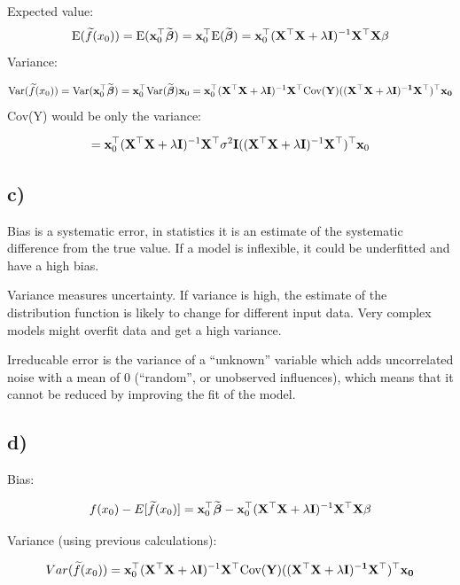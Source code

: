 \documentclass[
]{article}
\begin{document}
Expected value:
\[ \text{E}(\widetilde{f}({x_0})) = \text{E}(\mathbf{x}^\top_0 \widetilde{\boldsymbol \beta}) = \mathbf{x}^\top_0 \text{E}(\widetilde{\boldsymbol \beta}) = \mathbf{x}^\top_0 (\mathbf{X}^\top\mathbf{X}+\lambda {\bf I})^{-1}\mathbf{X}^\top\mathbf{X}\beta \]
Variance:

\[ \text{Var}(\widetilde{f}({x_0})) = \text{Var}(\mathbf{x}^\top_0 \widetilde{\boldsymbol \beta}) = \mathbf{x}^\top_0 \text{Var}(\widetilde{\boldsymbol \beta}) \mathbf{x}_0 = \mathbf{x}^\top_0 (\mathbf{X}^\top\mathbf{X}+\lambda {\bf I})^{-1}\mathbf{X}^\top \text{Cov}(\bf{Y}) ((\mathbf{X}^\top\mathbf{X}+\lambda {\bf I})^{-1}\mathbf{X}^\top)^\top \mathbf{x}_0 \]
Cov(Y) would be only the variance:

\[ = \mathbf{x}^\top_0 (\mathbf{X}^\top\mathbf{X}+\lambda {\bf I})^{-1}\mathbf{X}^\top \sigma^{2} \mathbf{I} ((\mathbf{X}^\top\mathbf{X}+\lambda {\bf I})^{-1}\mathbf{X}^\top)^\top \mathbf{x}_0 \]

\hypertarget{c}{%
\subsection{c)}\label{c}}

Bias is a systematic error, in statistics it is an estimate of the
systematic difference from the true value. If a model is inflexible, it
could be underfitted and have a high bias.

Variance measures uncertainty. If variance is high, the estimate of the
distribution function is likely to change for different input data. Very
complex models might overfit data and get a high variance.

Irreducable error is the variance of a ``unknown'' variable which adds
uncorrelated noise with a mean of 0 (``random'', or unobserved
influences), which means that it cannot be reduced by improving the fit
of the model.

\hypertarget{d}{%
\subsection{d)}\label{d}}

Bias:

\[ f({x_0}) - E[\widetilde{f}({x_0})] = \mathbf{x}^\top_0 \widetilde{\boldsymbol \beta} - \mathbf{x}^\top_0 (\mathbf{X}^\top\mathbf{X}+\lambda {\bf I})^{-1}\mathbf{X}^\top\mathbf{X}\beta  \]

Variance (using previous calculations):

\[  Var(\widetilde{f}({x_0})) = \mathbf{x}^\top_0 (\mathbf{X}^\top\mathbf{X}+\lambda {\bf I})^{-1}\mathbf{X}^\top \text{Cov}(\bf{Y}) ((\mathbf{X}^\top\mathbf{X}+\lambda {\bf I})^{-1}\mathbf{X}^\top)^\top \mathbf{x}_0 \]
\end{document}
